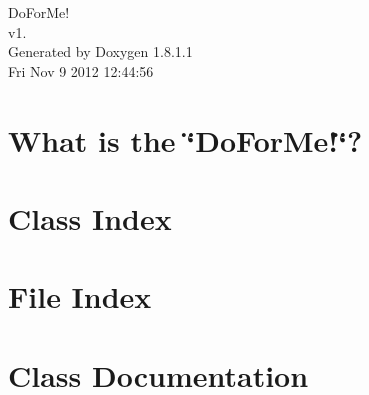 \documentclass{book}
\begin{document}
\hypersetup{pageanchor=false,citecolor=blue}
\begin{titlepage}
\vspace*{7cm}
\begin{center}
{\Large Do\-For\-Me! \\[1ex]\large v1. }\\
\vspace*{1cm}
{\large Generated by Doxygen 1.8.1.1}\\
\vspace*{0.5cm}
{\small Fri Nov 9 2012 12:44:56}\\
\end{center}
\end{titlepage}
\clearemptydoublepage
{}
\tableofcontents
\clearemptydoublepage
{}
\hypersetup{pageanchor=true,citecolor=blue}
\chapter{What is the \char`\"{}\-Do\-For\-Me!\char`\"{}?}
\label{index}\hypertarget{index}{}
\chapter{Class Index}

\chapter{File Index}

\chapter{Class Documentation}























\end{document}
